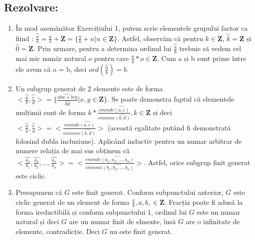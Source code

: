 \documentclass{article}
\begin{document}
\subsection{Rezolvare:}
\begin{enumerate}
    \item În mod asemănător Exercițiului 1, putem scrie elementele grupului factor ca fiind : $\widehat{\frac{a}{b}} = \frac{a}{b} + \mathbf{Z} = \{\frac{a}{b} + n | n \in \mathbf{Z}\}$. Astfel, observăm că pentru $k \in \mathbf{Z}$, $\widehat{k} = \mathbf{Z}$ și $\widehat{0} = \mathbf{Z}$. Prin urmare, pentru a determina ordinul lui $\widehat{\frac{a}{b}}$ trebuie să vedem cel mai mic număr natural $o$ pentru care $\frac{a}{b} * o \in \mathbf{Z}$. Cum a și b sunt prime între ele avem că o = b, deci $ord(\widehat{\frac{a}{b}}) = b$.
    
    \item Un subgrup generat de 2 elemente este de forma $<\widehat{\frac{a}{b}}, \widehat{\frac{c}{d}}> =\{\frac{\widehat{abx + bcy}}{\widehat{bd}} | x, y \in \mathbf{Z}\}.$ Se poate demonstra faptul că elementele mulțimii sunt de forma $k * \frac{cmmdc\widehat{(a,c)}}{cmmmc\widehat{(b,d)}}, k \in \mathbf{Z}$ și deci $<\widehat{\frac{a}{b}}, \widehat{\frac{c}{d}}> = <\frac{cmmdc\widehat{(a,c)}}{cmmmc\widehat{(b,d)}}>$ (această egalitate putând fi demonstrată folosind dubla incluziune). Aplicând inductiv pentru un numar arbitrar de numere relația de mai sus obținem că 
    \newline
    $<\widehat{\frac{a_1}{b_1}}, \widehat{\frac{a_2}{b_2}}, ..., \widehat{\frac{a_n}{b_n}}> = <\frac{cmmdc\widehat{(a_1, a_2, ..., a_n)}}{cmmmc\widehat{(b_1, b_2, ..., b_n)}} >$. Astfel, orice subgrup finit generat este ciclic.
    \item Presupunem că $G$ este finit generat. Conform subpunctului anterior, $G$ este ciclic generat de un element de forma $\frac{a}{b}, a, b, \in \mathbf{Z}.$ Fracția poate fi adusă la forma ireductibilă și conform subpunctului 1, ordinul lui $G$ este un numar natural și deci $G$ are un numar finit de elmente, însă $G$ are o infinitate de elemente, contradicție. Deci $G$ nu este finit generat.
    
\end{enumerate}
\end{document}
